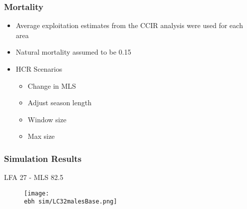 \documentclass{beamer}
\newcommand{\ebh}{\string~/bio.data/bio.lobster/figures/LFA2733Framework2018/} %
\begin{document}
\begin{frame}
\frametitle{Mortality}
\begin{itemize}
\item Average exploitation estimates from the CCIR analysis were used for each area
\item Natural mortality assumed to be 0.15



\item HCR Scenarios
\begin{itemize}
\item Change in MLS
\item Adjust season length
\item Window size
\item Max size
\end{itemize}

\end{itemize}
\end{frame}



\begin{frame}
\frametitle{Simulation Results}
LFA 27 - MLS 82.5
\begin{figure}
        \begin{center}
            \texttt{[image: \\ebh sim/LC32malesBase.png]}
        \end{center}
    \end{figure}
\end{frame}
\end{document}
